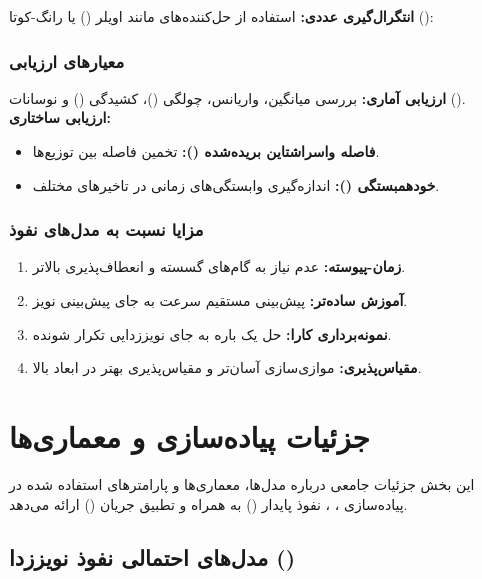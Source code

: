 \textbf{انتگرال‌گیری عددی:} استفاده از حل‌کننده‌های  مانند اویلر () یا رانگ-کوتا ():



\subsubsection{معیارهای ارزیابی}
\textbf{ارزیابی آماری:} بررسی میانگین، واریانس، چولگی ()، کشیدگی () و نوسانات ().\\
\textbf{ارزیابی ساختاری:} 
\begin{itemize}
    \item \textbf{فاصله واسراشتاین بریده‌شده ():} تخمین فاصله بین توزیع‌ها.
    \item \textbf{خودهمبستگی ():} اندازه‌گیری وابستگی‌های زمانی در تاخیرهای مختلف.
\end{itemize}

\subsubsection{مزایا نسبت به مدل‌های نفوذ}
\begin{enumerate}
    \item \textbf{زمان-پیوسته:} عدم نیاز به گام‌های گسسته و انعطاف‌پذیری بالاتر.
    \item \textbf{آموزش ساده‌تر:} پیش‌بینی مستقیم سرعت به جای پیش‌بینی نویز.
    \item \textbf{نمونه‌برداری کارا:} حل یک باره  به جای نویززدایی تکرار شونده.
    \item \textbf{مقیاس‌پذیری:} موازی‌سازی آسان‌تر و مقیاس‌پذیری بهتر در ابعاد بالا.
\end{enumerate}


\newpage

\section{جزئیات پیاده‌سازی و معماری‌ها}

این بخش جزئیات جامعی درباره مدل‌ها، معماری‌ها و پارامترهای استفاده شده در پیاده‌سازی ، ، نفوذ پایدار () به همراه  و تطبیق جریان () ارائه می‌دهد.

\subsection{مدل‌های احتمالی نفوذ نویززدا ()}

